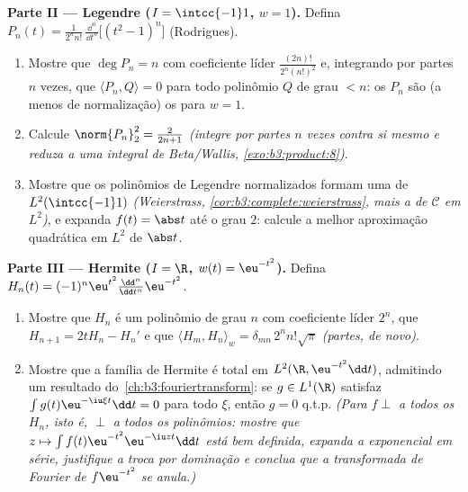 \begin{problem}
\medskip
\noindent\textbf{Parte II --- Legendre ($I = \intcc{-1}1$, $w =
1$).} Defina
$P_n(t) = \frac{1}{2^nn!}\,\frac{\dd^n}{\dd
t^n}\bigl[(t^2 - 1)^n\bigr]$ (Rodrigues).
\begin{enumerate}[resume]
  \item Mostre que $\deg P_n = n$ com coeficiente líder $\frac{(2n)!}{2^n(n!)^2}$ e, integrando por
        partes $n$ vezes, que $\langle P_n, Q\rangle = 0$ para todo polinômio $Q$ de
        grau $< n$: os $P_n$ são (a menos de normalização) os
         para $w = 1$.
  \item Calcule $\norm{P_n}_2^2 = \frac{2}{2n+1}$ \emph{(integre por partes $n$ vezes contra si
        mesmo e reduza a uma integral de Beta/Wallis,
        \cref{exo:b3:product:8})}.
  \item Mostre que os polinômios de Legendre normalizados formam uma
         de $L^2(\intcc{-1}1)$ \emph{(Weierstrass,
        \cref{cor:b3:complete:weierstrass}, mais a  de $\mathcal C$ em $L^2$)}, e
        expanda $f(t) = \abs t$ até o grau $2$: calcule a melhor aproximação
        quadrática em $L^2$ de $\abs t$.
\end{enumerate}

\medskip
\noindent\textbf{Parte III --- Hermite ($I = \R$, $w(t) =
\eu^{-t^2}$).} Defina
$H_n(t) =
(-1)^n\eu^{t^2}\frac{\dd^n}{\dd t^n}\eu^{-t^2}$.
\begin{enumerate}[resume]
  \item Mostre que $H_n$ é um polinômio de grau $n$ com
        coeficiente líder $2^n$, que $H_{n+1} = 2tH_n -
        H_n'$ e que $\langle H_m, H_n\rangle_w =
        \delta_{mn}\,2^nn!\sqrt\pi$ \emph{(partes,
        de novo)}.
  \item Mostre que a família de Hermite é total em $L^2(\R,
        \eu^{-t^2}\dd t)$, admitindo um
        resultado do~\cref{ch:b3:fouriertransform}: se $g \in L^1(\R)$ satisfaz $\int g(t)\eu^{-\iu\xi t}\dd t = 0$ para todo
        $\xi$, então $g = 0$ q.t.p. \emph{(Para $f \perp$ a todos os
        $H_n$, isto é, $\perp$ a todos os polinômios: mostre que
        $z \mapsto \int
        f(t)\eu^{-t^2}\eu^{-\iu zt}\dd t$ está bem definida, expanda a exponencial em série,
        justifique a troca por dominação e conclua que a transformada
        de Fourier de $f\eu^{-t^2}$ se anula.)}
\end{enumerate}


\end{problem}
